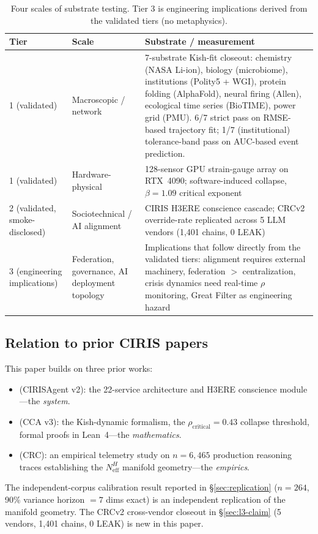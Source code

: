 \documentclass[11pt,a4paper]{article}
\begin{document}
\begin{table}[h]
\centering
\small
\begin{tabular}{p{2.5cm}p{4.5cm}p{6cm}}
\toprule
\textbf{Tier} & \textbf{Scale} & \textbf{Substrate / measurement} \\
\midrule
1 (validated) & Macroscopic / network & 7-substrate Kish-fit closeout: chemistry (NASA Li-ion), biology (microbiome), institutions (Polity5 + WGI), protein folding (AlphaFold), neural firing (Allen), ecological time series (BioTIME), power grid (PMU). 6/7 strict pass on RMSE-based trajectory fit; 1/7 (institutional) tolerance-band pass on AUC-based event prediction. \\
1 (validated) & Hardware-physical & 128-sensor GPU strain-gauge array on RTX~4090; software-induced collapse, $\beta = 1.09$ critical exponent \\
2 (validated, smoke-disclosed) & Sociotechnical / AI alignment & CIRIS H3ERE conscience cascade; CRCv2 override-rate replicated across 5 LLM vendors (1,401 chains, 0 LEAK) \\
3 (engineering implications) & Federation, governance, AI deployment topology & Implications that follow directly from the validated tiers: alignment requires external machinery, federation $>$ centralization, crisis dynamics need real-time $\rho$ monitoring, Great Filter as engineering hazard \\
\bottomrule
\end{tabular}
\caption{Four scales of substrate testing. Tier 3 is engineering implications derived from the validated tiers (no metaphysics).}
\label{tab:scales}
\end{table}

\subsection{Relation to prior CIRIS papers}
This paper builds on three prior works:
\begin{itemize}
  \item \cite{moore_cirisagent_2026} (CIRISAgent v2): the 22-service architecture and H3ERE conscience module---the \emph{system}.
  \item \cite{moore_cca_2026} (CCA v3): the Kish-dynamic formalism, the $\rho_{\text{critical}} = 0.43$ collapse threshold, formal proofs in Lean~4---the \emph{mathematics}.
  \item \cite{moore_crc_2026} (CRC): an empirical telemetry study on $n=6{,}465$ production reasoning traces establishing the $N_{\text{eff}}^H$ manifold geometry---the \emph{empirics}.
\end{itemize}
The independent-corpus calibration result reported in \S\ref{sec:replication} ($n=264$, 90\% variance horizon $= 7$ dims exact) is an independent replication of the manifold geometry. The CRCv2 cross-vendor closeout in \S\ref{sec:l3-claim} (5 vendors, 1,401 chains, 0 LEAK) is new in this paper.
\end{document}
